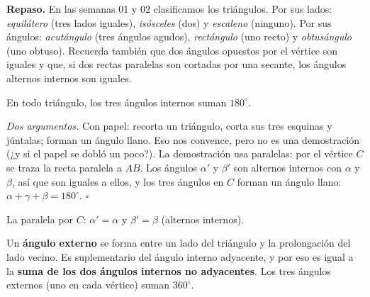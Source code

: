 \documentclass[11pt]{article}
\begin{document}
\textbf{Repaso.} En las semanas 01 y 02 clasificamos los triángulos. Por sus
lados: \emph{equilátero} (tres lados iguales), \emph{isósceles} (dos) y
\emph{escaleno} (ninguno). Por sus ángulos: \emph{acutángulo} (tres ángulos
agudos), \emph{rectángulo} (uno recto) y \emph{obtusángulo} (uno obtuso).
Recuerda también que dos ángulos opuestos por el vértice son iguales y que,
si dos rectas paralelas son cortadas por una secante, los ángulos alternos
internos son iguales.

\begin{teorema}
En todo triángulo, los tres ángulos internos suman $180^\circ$.
\end{teorema}

\emph{Dos argumentos.} Con papel: recorta un triángulo, corta sus tres
esquinas y júntalas; forman un ángulo llano. Eso nos convence, pero no es
una demostración (¿y si el papel se dobló un poco?). La demostración usa
paralelas: por el vértice $C$ se traza la recta paralela a $AB$. Los
ángulos $\alpha'$ y $\beta'$ son alternos internos con $\alpha$ y $\beta$,
así que son iguales a ellos, y los tres ángulos en $C$ forman un ángulo
llano: $\alpha + \gamma + \beta = 180^\circ$. \hfill$\square$

\begin{center}

{\small La paralela por $C$: $\alpha' = \alpha$ y $\beta' = \beta$ (alternos internos).}
\end{center}

\begin{definicion}
Un \textbf{ángulo externo} se forma entre un lado del triángulo y la
prolongación del lado vecino. Es suplementario del ángulo interno
adyacente, y por eso es igual a la \textbf{suma de los dos ángulos
internos no adyacentes}. Los tres ángulos externos (uno en cada vértice)
suman $360^\circ$.
\end{definicion}
\end{document}
